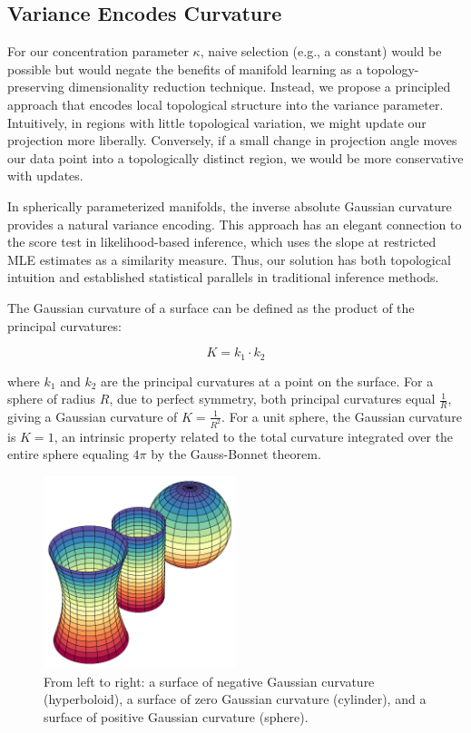 \documentclass[twoside,11pt]{article}
\begin{document}
\subsection{Variance Encodes Curvature}\label{sc:curvature}

For our concentration parameter $\kappa$, naive selection (e.g., a constant) would be possible but would negate the benefits of manifold learning as a topology-preserving dimensionality reduction technique. Instead, we propose a principled approach that encodes local topological structure into the variance parameter. Intuitively, in regions with little topological variation, we might update our projection more liberally. Conversely, if a small change in projection angle moves our data point into a topologically distinct region, we would be more conservative with updates.

In spherically parameterized manifolds, the inverse absolute Gaussian curvature provides a natural variance encoding. This approach has an elegant connection to the score test in likelihood-based inference, which uses the slope at restricted MLE estimates as a similarity measure. Thus, our solution has both topological intuition and established statistical parallels in traditional inference methods.

The Gaussian curvature of a surface can be defined as the product of the principal curvatures:

$$K = k_1 \cdot k_2$$

where $k_1$ and $k_2$ are the principal curvatures at a point on the surface. For a sphere of radius $R$, due to perfect symmetry, both principal curvatures equal $\frac{1}{R}$, giving a Gaussian curvature of $K = \frac{1}{R^2}$. For a unit sphere, the Gaussian curvature is $K = 1$, an intrinsic property related to the total curvature integrated over the entire sphere equaling $4\pi$ by the Gauss-Bonnet theorem.

\begin{figure}[h!]
  \begin{center}
    \includegraphics[width=0.5\textwidth]{../fig/gaussian-curvature.png}
  \end{center}
  \caption{From left to right: a surface of negative Gaussian curvature (hyperboloid), a surface of zero Gaussian curvature (cylinder), and a surface of positive Gaussian curvature (sphere).}\label{fig:gaussian-curvature}
\end{figure}
\end{document}
